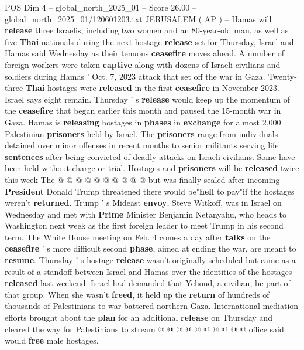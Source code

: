 \begin{textsample}{POS Dim 4 – global\_north\_2025\_01 – Score 26.00 – global\_north\_2025\_01/120601203.txt}  \label{ex:f4_pos_050}
JERUSALEM ( AP ) -- Hamas will \textbf{release} three Israelis, including two women and an 80-year-old man, as well as five \textbf{Thai} nationals during the next hostage \textbf{release} set for Thursday, Israel and Hamas said Wednesday as their tenuous \textbf{ceasefire} moves ahead.
A number of foreign workers were taken \textbf{captive} along with dozens of Israeli civilians and soldiers during Hamas ' Oct. 7, 2023 attack that set off the war in Gaza.
Twenty-three \textbf{Thai} hostages were \textbf{released} in the first \textbf{ceasefire} in November 2023.
Israel says eight remain.
Thursday ' s \textbf{release} would keep up the momentum of the \textbf{ceasefire} that began earlier this month and paused the 15-month war in Gaza.
Hamas is \textbf{releasing} hostages in \textbf{phases} in \textbf{exchange} for almost 2,000 Palestinian \textbf{prisoners} held by Israel.
The \textbf{prisoners} range from individuals detained over minor offenses in recent months to senior militants serving life \textbf{sentences} after being convicted of deadly attacks on Israeli civilians.
Some have been held without charge or trial.
Hostages and \textbf{prisoners} will be \textbf{released} twice this week The @ @ @ @ @ @ @ @ @ @ but was finally sealed after incoming \textbf{President} Donald Trump threatened there would be"\textbf{hell} to pay"if the hostages weren't \textbf{returned}.
Trump ' s Mideast \textbf{envoy}, Steve Witkoff, was in Israel on Wednesday and met with \textbf{Prime} Minister Benjamin Netanyahu, who heads to Washington next week as the first foreign leader to meet Trump in his second term.
The White House meeting on Feb. 4 comes a day after \textbf{talks} on the \textbf{ceasefire} ' s more difficult second \textbf{phase}, aimed at ending the war, are meant to \textbf{resume}.
Thursday ' s hostage \textbf{release} wasn't originally scheduled but came as a result of a standoff between Israel and Hamas over the identities of the hostages \textbf{released} last weekend.
Israel had demanded that Yehoud, a civilian, be part of that group.
When she wasn't \textbf{freed}, it held up the \textbf{return} of hundreds of thousands of Palestinians to war-battered northern Gaza.
International mediation efforts brought about the \textbf{plan} for an additional \textbf{release} on Thursday and cleared the way for Palestinians to stream @ @ @ @ @ @ @ @ @ @ office said would \textbf{free} male hostages.

\end{textsample}
